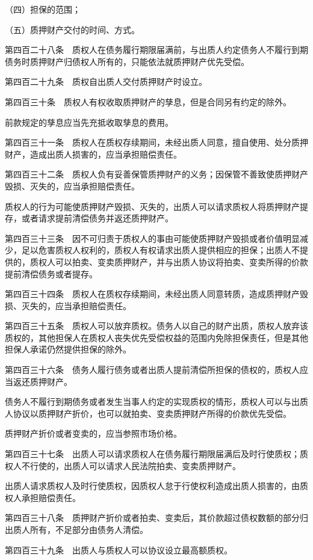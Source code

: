 \documentclass[UTF8,12pt,a4paper]{ctexbook}
\begin{document}
（四）担保的范围；

（五）质押财产交付的时间、方式。

第四百二十八条　质权人在债务履行期限届满前，与出质人约定债务人不履行到期债务时质押财产归债权人所有的，只能依法就质押财产优先受偿。

第四百二十九条　质权自出质人交付质押财产时设立。

第四百三十条　质权人有权收取质押财产的孳息，但是合同另有约定的除外。

前款规定的孳息应当先充抵收取孳息的费用。

第四百三十一条　质权人在质权存续期间，未经出质人同意，擅自使用、处分质押财产，造成出质人损害的，应当承担赔偿责任。

第四百三十二条　质权人负有妥善保管质押财产的义务；因保管不善致使质押财产毁损、灭失的，应当承担赔偿责任。

质权人的行为可能使质押财产毁损、灭失的，出质人可以请求质权人将质押财产提存，或者请求提前清偿债务并返还质押财产。

第四百三十三条　因不可归责于质权人的事由可能使质押财产毁损或者价值明显减少，足以危害质权人权利的，质权人有权请求出质人提供相应的担保；出质人不提供的，质权人可以拍卖、变卖质押财产，并与出质人协议将拍卖、变卖所得的价款提前清偿债务或者提存。

第四百三十四条　质权人在质权存续期间，未经出质人同意转质，造成质押财产毁损、灭失的，应当承担赔偿责任。

第四百三十五条　质权人可以放弃质权。债务人以自己的财产出质，质权人放弃该质权的，其他担保人在质权人丧失优先受偿权益的范围内免除担保责任，但是其他担保人承诺仍然提供担保的除外。

第四百三十六条　债务人履行债务或者出质人提前清偿所担保的债权的，质权人应当返还质押财产。

债务人不履行到期债务或者发生当事人约定的实现质权的情形，质权人可以与出质人协议以质押财产折价，也可以就拍卖、变卖质押财产所得的价款优先受偿。

质押财产折价或者变卖的，应当参照市场价格。

第四百三十七条　出质人可以请求质权人在债务履行期限届满后及时行使质权；质权人不行使的，出质人可以请求人民法院拍卖、变卖质押财产。

出质人请求质权人及时行使质权，因质权人怠于行使权利造成出质人损害的，由质权人承担赔偿责任。

第四百三十八条　质押财产折价或者拍卖、变卖后，其价款超过债权数额的部分归出质人所有，不足部分由债务人清偿。

第四百三十九条　出质人与质权人可以协议设立最高额质权。
\end{document}
